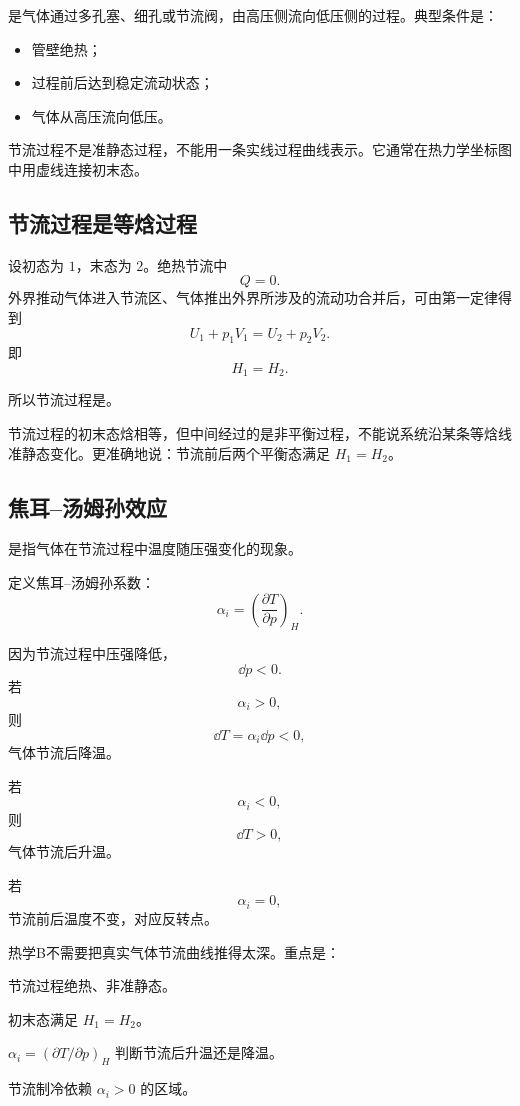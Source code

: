 是气体通过多孔塞、细孔或节流阀，由高压侧流向低压侧的过程。典型条件是：
\begin{itemize}
  \item 管壁绝热；
  \item 过程前后达到稳定流动状态；
  \item 气体从高压流向低压。
\end{itemize}

节流过程不是准静态过程，不能用一条实线过程曲线表示。它通常在热力学坐标图中用虚线连接初末态。

\subsection{节流过程是等焓过程}

设初态为 \(1\)，末态为 \(2\)。绝热节流中
\[
  Q=0.
\]
外界推动气体进入节流区、气体推出外界所涉及的流动功合并后，可由第一定律得到
\[
  U_1+p_1V_1=U_2+p_2V_2.
\]
即
\[
  \boxed{
  H_1=H_2
  }.
\]

所以节流过程是。

\begin{WarnBox}
节流过程的初末态焓相等，但中间经过的是非平衡过程，不能说系统沿某条等焓线准静态变化。更准确地说：节流前后两个平衡态满足 \(H_1=H_2\)。
\end{WarnBox}

\subsection{焦耳--汤姆孙效应}

是指气体在节流过程中温度随压强变化的现象。

定义焦耳--汤姆孙系数：
\[
  \boxed{
  \alpha_i
  =
  \left(\frac{\partial T}{\partial p}\right)_H
  }.
\]

因为节流过程中压强降低，
\[
  \dd p<0.
\]
若
\[
  \alpha_i>0,
\]
则
\[
  \dd T=\alpha_i\dd p<0,
\]
气体节流后降温。

若
\[
  \alpha_i<0,
\]
则
\[
  \dd T>0,
\]
气体节流后升温。

若
\[
  \alpha_i=0,
\]
节流前后温度不变，对应反转点。

\begin{KeyBox}[焦耳--汤姆孙效应的复习重点]
热学B不需要把真实气体节流曲线推得太深。重点是：
\begin{ReviewList}
  \item 节流过程绝热、非准静态。
  \item 初末态满足 \(H_1=H_2\)。
  \item \(\alpha_i=(\partial T/\partial p)_H\) 判断节流后升温还是降温。
  \item 节流制冷依赖 \(\alpha_i>0\) 的区域。
\end{ReviewList}
\end{KeyBox}

